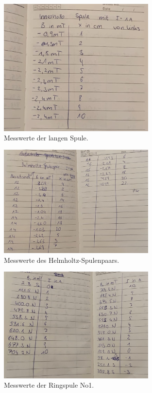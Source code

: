 \begin{figure}
  \centering
  \includegraphics[width=0.7\textwidth]{Spule.jpeg}
  \caption{Messwerte der langen Spule.}
  \label{fig:M1}
\end{figure}
\begin{figure}
    \centering
    \includegraphics[width=0.7\textwidth]{Helm.jpeg}
    \caption{Messwerte des Helmholtz-Spulenpaars.}
    \label{fig:M2}
\end{figure}
\begin{figure}
    \centering
    \includegraphics[width=0.7\textwidth]{Ring1.jpeg}
    \caption{Messwerte der Ringspule No1.}
    \label{fig:M3}
\end{figure}
